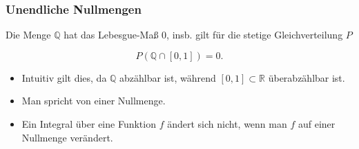 \begin{frame}
  \frametitle{Unendliche Nullmengen}
  Die Menge $\mathbb{Q}$ hat das Lebesgue-Maß $0$, insb. gilt für die stetige Gleichverteilung $P$
  
  \[P(\mathbb{Q} \cap [0,1]) = 0.\]

\bigskip\pause

\begin{itemize}
\item Intuitiv gilt dies, da $\mathbb{Q}$ abzählbar ist, während $[0, 1] \subset \mathbb{R}$ überabzählbar ist.\smallskip\pause
\item Man spricht von einer \alert{Nullmenge}.\smallskip\pause
\item Ein Integral über eine Funktion $f$ ändert sich nicht, wenn man $f$ auf einer Nullmenge verändert.
\end{itemize}
\end{frame}


    


